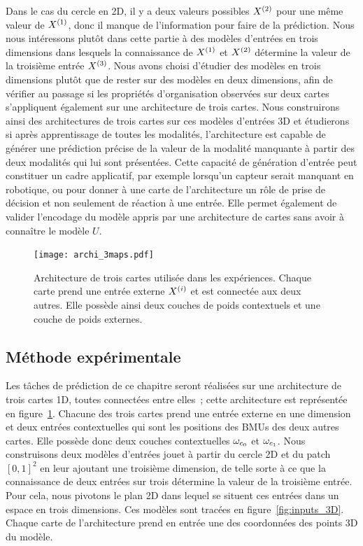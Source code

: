 \documentclass[../main]{subfiles}
\begin{document}
Dans le cas du cercle en 2D, il y a deux valeurs possibles $X^{({2})}$ pour une même valeur de $X^{({1})}$, donc il manque de l'information pour faire de la prédiction.
Nous nous intéressons plutôt dans cette partie à des modèles d'entrées en trois dimensions dans lesquels la connaissance de $X^{({1})}$ et $X^{({2})}$ détermine la valeur de la troisième entrée $X^{({3})}$.
Nous avons choisi d'étudier des modèles en trois dimensions plutôt que de rester sur des modèles en deux dimensions, afin de vérifier au passage si les propriétés d'organisation observées sur deux cartes s'appliquent également sur une architecture de trois cartes.
Nous construirons ainsi des architectures de trois cartes sur ces modèles d'entrées 3D et étudierons si après apprentissage de toutes les modalités, l'architecture est capable de générer une prédiction précise de la valeur de la modalité manquante à partir des deux modalités qui lui sont présentées.
Cette capacité de génération d'entrée peut constituer un cadre applicatif, par exemple lorsqu'un capteur serait manquant en robotique, ou pour donner à une carte de l'architecture un rôle de prise de décision et non seulement de réaction à une entrée.
Elle permet également de valider l'encodage du modèle appris par une architecture de cartes sans avoir à connaître le modèle $U$.
\begin{figure}[H]
	\centering\texttt{[image: archi\_3maps.pdf]}
	\vspace{-0.5cm}
	\caption{Architecture de trois cartes utilisée dans les expériences. Chaque carte prend une entrée externe $X^{({i})}$ et est connectée aux deux autres. Elle possède ainsi deux couches de poids contextuels et une couche de poids externes.\label{fig:archi_3maps}}
\end{figure}
\subsection{Méthode expérimentale}

Les tâches de prédiction de ce chapitre seront réalisées sur une architecture de trois cartes 1D, toutes connectées entre elles~; cette architecture est représentée en figure~\ref{fig:archi_3maps}.
Chacune des trois cartes prend une entrée externe en une dimension et deux entrées contextuelles qui sont les positions des BMUs des deux autres cartes. Elle possède donc deux couches contextuelles $\omega_{c_0}$ et $\omega_{c_1}$.
Nous construisons deux modèles d'entrées jouet à partir du cercle 2D et du patch $[0,1]^2$ en leur ajoutant une troisième dimension, de telle sorte à ce que la connaissance de deux entrées sur trois détermine la valeur de la troisième entrée. Pour cela, nous pivotons le plan 2D dans lequel se situent ces entrées dans un espace en trois dimensions.
Ces modèles sont tracées en figure~\ref{fig:inputs_3D}.
Chaque carte de l'architecture prend en entrée une des coordonnées des points 3D du modèle.
\end{document}
